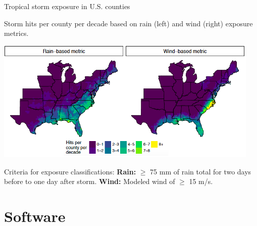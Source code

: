 \documentclass[ignorenonframetext,]{beamer}
\begin{document}
\begin{frame}{Tropical storm exposure in U.S. counties}

\begin{centering}
\small Storm hits per county per decade based on rain (left) and wind (right) exposure metrics.
\end{centering}

\begin{center}\includegraphics[width=0.95\textwidth]{hurricane_exposure} \end{center}

\vspace{-0.7cm} \scriptsize Criteria for exposure classifications:
\textbf{Rain:} \(\ge\) 75 mm of rain total for two days before to one
day after storm. \textbf{Wind:} Modeled wind of \(\ge\) 15 m/s.

\end{frame}

\section{Software}\label{software}
\end{document}
